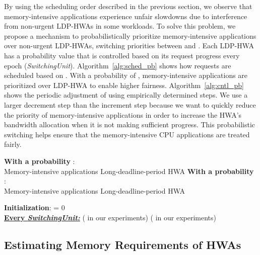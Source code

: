 \documentclass[10pt,letterpaper]{article}
\newcommand{\ldphwas}[0]{LDP-HWAs\xspace}
\newif\ifSQUEEZE
\begin{document}
By using the scheduling order described in the previous section, we observe that
memory-intensive applications experience unfair slowdowns due to interference
from non-urgent \ldphwas in some workloads. To solve this problem, we propose a
mechanism to probabilistically prioritize memory-intensive applications over
non-urgent LDP-HWAs, switching priorities between  and . Each
LDP-HWA  has a probability value  that is controlled based on its
request progress every epoch ({\it SwitchingUnit}).
Algorithm~\ref{alg:sched_pb} shows how requests are scheduled based on .
With a probability of , memory-intensive applications are prioritized
over LDP-HWA  to enable higher fairness. Algorithm~\ref{alg:cntl_pb} shows
the periodic adjustment of  using empirically determined steps. We use a
larger decrement step than the increment step because we want to quickly reduce
the priority of memory-intensive applications in order to increase the HWA's
bandwidth allocation when it is not making sufficient progress. This
probabilistic switching helps ensure that the memory-intensive CPU applications
are treated fairly.


\vspace{-2mm}
\begin{algorithm}[t!]
\caption{Scheduling using }
\label{alg:sched_pb}
\small
\begin{algorithmic}
\STATE \textbf{With a probability }: \\
Memory-intensive applications  Long-deadline-period HWA 
\STATE \textbf{With a probability }: \\
Memory-intensive applications  Long-deadline-period HWA 
\end{algorithmic}
\end{algorithm}
\vspace{-2mm}

\begin{algorithm}[t!]
\caption{Controlling  for LDP-HWAs}
\label{alg:cntl_pb}
\small
\begin{algorithmic}
\STATE \textbf{Initialization}:  = 0\\
\textbf{\underline{Every {\it SwitchingUnit:}}}
\STATE  ( in our experiments)
\STATE  ( in our experiments)
\ELSE
\STATE 
\ENDIF
\end{algorithmic}
\end{algorithm}
\vspace{-5mm}

\ifSQUEEZE
\else
\subsection{Estimating Memory Requirements of HWAs}
\end{document}
